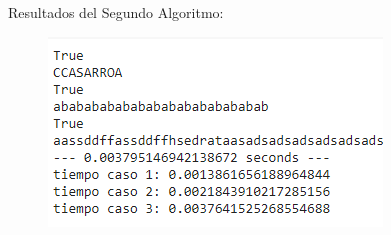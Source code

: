 \documentclass[]{article}
\numberwithin{equation}{section}
\numberwithin{figure}{section}
\theoremstyle{definition}
\begin{document}
\text Resultados del Segundo Algoritmo:

\begin{figure}[H]
	\includegraphics{Algoritmo 2}
    \centering
\end{figure}
\end{document}
